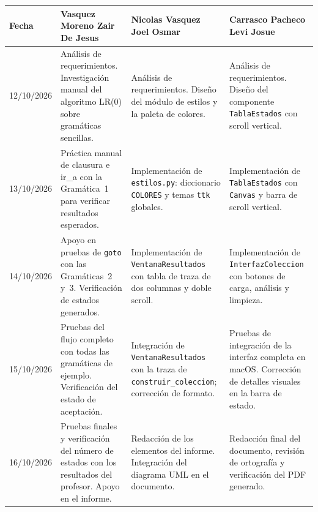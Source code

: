 \vspace{0.4cm}
\scriptsize
\begin{longtable}{|P{1.8cm}|P{4.4cm}|P{4.4cm}|P{4.4cm}|}
\hline
{}
{\color{white}\textbf{Fecha}} &
{\color{white}\textbf{Vasquez Moreno Zair De Jesus}} &
{\color{white}\textbf{Nicolas Vasquez Joel Osmar}} &
{\color{white}\textbf{Carrasco Pacheco Levi Josue}} \\
\hline
\endhead

12/10/2026 &
  Análisis de requerimientos. Investigación manual del algoritmo LR(0) sobre
  gramáticas sencillas. &
  Análisis de requerimientos. Diseño del módulo de estilos y la paleta de colores. &
  Análisis de requerimientos. Diseño del componente \texttt{TablaEstados} con
  scroll vertical. \\[3pt]
\hline

13/10/2026 &
  Práctica manual de clausura e ir\_a con la Gramática~1 para verificar resultados
  esperados. &
  Implementación de \texttt{estilos.py}: diccionario \texttt{COLORES} y temas
  \texttt{ttk} globales. &
  Implementación de \texttt{TablaEstados} con \texttt{Canvas} y barra de scroll
  vertical. \\[3pt]
\hline

14/10/2026 &
  Apoyo en pruebas de \texttt{goto} con las Gramáticas~2 y~3. Verificación de
  estados generados. &
  Implementación de \texttt{VentanaResultados} con tabla de traza de dos columnas
  y doble scroll. &
  Implementación de \texttt{InterfazColeccion} con botones de carga, análisis y
  limpieza. \\[3pt]
\hline

15/10/2026 &
  Pruebas del flujo completo con todas las gramáticas de ejemplo. Verificación del
  estado de aceptación. &
  Integración de \texttt{VentanaResultados} con la traza de
  \texttt{construir\_coleccion}; corrección de formato. &
  Pruebas de integración de la interfaz completa en macOS. Corrección de detalles
  visuales en la barra de estado. \\[3pt]
\hline

16/10/2026 &
  Pruebas finales y verificación del número de estados con los resultados del
  profesor. Apoyo en el informe. &
  Redacción de los elementos del informe. Integración del diagrama UML en el
  documento. &
  Redacción final del documento, revisión de ortografía y verificación del PDF
  generado. \\[3pt]
\hline

\end{longtable}
\normalsize
